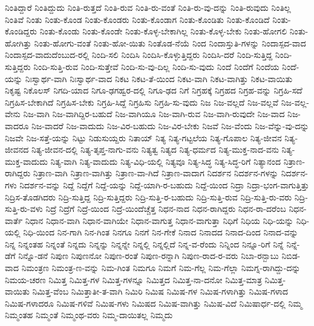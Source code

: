 {ನಿಂತಿದ್ದಾರೆ
ನಿಂತಿದ್ದುದು
ನಿಂತಿ-ರುತ್ತದೆ
ನಿಂತಿ-ರುವ
ನಿಂತಿ-ರು-ವಂತೆ
ನಿಂತಿ-ರು-ವು-ದನ್ನು
ನಿಂತಿ-ರುವುದು
ನಿಂತಿಲ್ಲ
ನಿಂತಿವೆ
ನಿಂತು
ನಿಂತು-ಕೊಂಡ
ನಿಂತು-ಕೊಂಡರು
ನಿಂತು-ಕೊಂಡಾಗ
ನಿಂತು-ಕೊಂಡಿತು
ನಿಂತು-ಕೊಂಡಿದೆ
ನಿಂತು-ಕೊಂಡಿದ್ದರು
ನಿಂತು-ಕೊಂಡು
ನಿಂತು-ಕೊಂಡೇ
ನಿಂತು-ಕೊಳ್ಳ-ಬೇಕಾಗಿಲ್ಲ
ನಿಂತು-ಕೊಳ್ಳ-ಬೇಕು
ನಿಂತು-ಹೋಗಲಿ
ನಿಂತು-ಹೋಗಿತ್ತು
ನಿಂತು-ಹೋಗು-ವಂತೆ
ನಿಂತು-ಹೋ-ಯಿತು
ನಿಂತೊಡ-ನೆಯೆ
ನಿಂದ
ನಿಂದಾಸ್ತುತಿ-ಗಳನ್ನು
ನಿಂದಾಸ್ಪದ-ವಾದ
ನಿಂದಾಸ್ಪದ-ವಾದುದೆಂಬುದ-ರಲ್ಲಿ
ನಿಂದಿ-ಸಲಿ
ನಿಂದಿಸಿ
ನಿಂದಿಸಿ-ಕೊಳ್ಳುತ್ತಿದ್ದರು
ನಿಂದಿಸಿ-ದರೆ
ನಿಂದಿ-ಸುತ್ತಿದ್ದ
ನಿಂದಿ-ಸುತ್ತಿದ್ದರು
ನಿಂದಿ-ಸುತ್ತಿ-ರುವ
ನಿಂದಿ-ಸುತ್ತೇವೆ
ನಿಂದಿ-ಸು-ವು-ದಿಲ್ಲ
ನಿಂದಿ-ಸು-ವುದು
ನಿಂದೆ
ನಿಂದೆಗೆ
ನಿಂದೆಯ
ನಿಂದೆ-ಯನ್ನು
ನಿಃಸ್ವಾರ್ಥ-ವಾಗಿ
ನಿಃಸ್ವಾರ್ಥ-ವಾದ
ನಿಕಟ
ನಿಕಟ-ತೆ-ಯಿಂದ
ನಿಕಟ-ವಾಗಿ
ನಿಕಟ-ವಾಗಿತ್ತು
ನಿಕಟ-ವಾಯಿತು
ನಿಕೃಷ್ಟ
ನಿಕೊಲಸ್
ನಿಗದಿ-ಯಾದ
ನಿಗೂ-ಢಗಹ್ವರ-ದಲ್ಲಿ
ನಿಗೂ-ಢದ
ನಿಗೆ
ನಿಗ್ರಹಕ್ಕೆ
ನಿಗ್ರಹದ
ನಿಗ್ರಹ-ವನ್ನು
ನಿಗ್ರಹಿ-ಸದೆ
ನಿಗ್ರಹಿಸ-ಬೇಕಾಗಿದೆ
ನಿಗ್ರಹಿಸ-ಬೇಕು
ನಿಗ್ರಹಿ-ಸಿದ್ದೆ
ನಿಗ್ರಹಿಸು
ನಿಗ್ರಹಿ-ಸು-ವುದು
ನಿಜ
ನಿಜ-ವಲ್ಲದೆ
ನಿಜ-ವಲ್ಲವೆ
ನಿಜ-ವಲ್ಲ-ವೇನು
ನಿಜ-ವಾಗಿ
ನಿಜ-ವಾಗಿದ್ದಿರ-ಬಹುದೆ
ನಿಜ-ವಾಗಿಯೂ
ನಿಜ-ವಾಗಿ-ರುವ
ನಿಜ-ವಾಗಿ-ರುವುದೇ
ನಿಜ-ವಾದ
ನಿಜ-ವಾದರೂ
ನಿಜ-ವಾದರೆ
ನಿಜ-ವಾದುದು
ನಿಜ-ವಿರ-ಬಹುದು
ನಿಜ-ವಿರ-ಬೇಕು
ನಿಜವೆ
ನಿಜ-ವೆಂದು
ನಿಜ-ವೆನ್ನು-ವು-ದನ್ನು
ನಿಜವೇ
ನಿಜ-ಸತ್ತೆ-ಯನ್ನು
ನಿಟ್ಟು
ನಿಡುಸುಯ್ದರು
ನಿತಾಯ್
ನಿತ್ಯ
ನಿತ್ಯ-ಗಟ್ಟಲೆಯ
ನಿತ್ಯ-ಗೊಪಾಲ
ನಿತ್ಯ-ಜೀವನ
ನಿತ್ಯ-ಜೀವನದ
ನಿತ್ಯ-ಜೀವನ-ದಲ್ಲಿ
ನಿತ್ಯ-ತೃಪ್ತ-ನಾಗು-ವನು
ನಿತ್ಯತ್ವ
ನಿತ್ಯದ
ನಿತ್ಯ-ಧರ್ಮದ
ನಿತ್ಯ-ಮುಕ್ತ-ನಾದ-ವನು
ನಿತ್ಯ-ಮುಕ್ತ-ವಾದುದು
ನಿತ್ಯ-ವಾಗಿ
ನಿತ್ಯ-ವಾದುದು
ನಿತ್ಯ-ವಿಧಿ-ಯಲ್ಲಿ
ನಿತ್ಯವೂ
ನಿತ್ಯ-ಸಿದ್ಧ
ನಿತ್ಯ-ಸಿದ್ಧ-ರಿಗೆ
ನಿತ್ಯಾನಂದ
ನಿತ್ರಾಣ-ರಾಗಿದ್ದರು
ನಿತ್ರಾಣ-ವಾಗಿ
ನಿತ್ರಾಣ-ವಾಗಿತ್ತು
ನಿತ್ರಾಣ-ವಾ-ಗಿದೆ
ನಿತ್ರಾಣ-ವಾದಾಗ
ನಿದರ್ಶನ
ನಿದರ್ಶನ-ಗಳನ್ನು
ನಿದರ್ಶನ-ಗಳು
ನಿದರ್ಶನ-ವನ್ನು
ನಿದ್ದೆ
ನಿದ್ದೆಗೆ
ನಿದ್ದೆ-ಯನ್ನು
ನಿದ್ದೆ-ಯಾಗಿ-ರ-ಬಹುದು
ನಿದ್ದೆ-ಯಿಂದ
ನಿದ್ರಾ
ನಿದ್ರಾ-ಭಂಗ-ವಾಗುತ್ತಿತ್ತು
ನಿದ್ರಿಸ-ತೊಡಗಿದರು
ನಿದ್ರಿ-ಸುತ್ತಿದ್ದ
ನಿದ್ರಿ-ಸುತ್ತಿದ್ದರು
ನಿದ್ರಿ-ಸುತ್ತಿ-ರ-ಬಹುದು
ನಿದ್ರಿ-ಸುತ್ತಿ-ರುವ
ನಿದ್ರಿ-ಸುತ್ತಿ-ರು-ವರು
ನಿದ್ರಿ-ಸುತ್ತಿ-ರು-ವಳು
ನಿದ್ರೆ
ನಿದ್ರೆಗೆ
ನಿದ್ರೆ-ಯಿಂದ
ನಿದ್ರೆ-ಯಿಂದೆಚ್ಚೆತ್ತ
ನಿಧನ-ನಾದ
ನಿಧನ-ರಾಗಿದ್ದರು
ನಿಧನ-ರಾ-ದರೆಂಬ
ನಿಧನ-ವಾರ್ತೆ
ನಿಧಾನ
ನಿಧಾನ-ವಾಗಿ
ನಿಧಾನ-ವಾಗಿಯೇ
ನಿಧಾನ-ವಾಗುತ್ತ
ನಿಧಾನ-ವಾಗುತ್ತಾ
ನಿಧಿಗೆ
ನಿಧಿಯ
ನಿಧಿ-ಯನ್ನು
ನಿಧಿ-ಯಲ್ಲಿ
ನಿಧಿ-ಯಿಂದ
ನಿನ-ಗಾಗಿ
ನಿನ-ಗಿಂತ
ನಿನಗೂ
ನಿನಗೆ
ನಿನ-ಗೇಕೆ
ನಿನಾದ
ನಿನಾದದ
ನಿನಾದ-ದಿಂದ
ನಿನಾದ-ವನ್ನು
ನಿನ್ನ
ನಿನ್ನಂತಹ
ನಿನ್ನಂತೆ
ನಿನ್ನದು
ನಿನ್ನನ್ನು
ನಿನ್ನನ್ನೇ
ನಿನ್ನಲ್ಲಿ
ನಿನ್ನಲ್ಲಿದೆ
ನಿನ್ನ-ವ-ರೆಂದು
ನಿನ್ನಿಂದ
ನಿನ್ನೂ-ರಿಗೆ
ನಿನ್ನೆ
ನಿನ್ನೆ-ಡೆಗೆ
ನಿನ್ನೊ-ಡನೆ
ನಿಪುಣ
ನಿಪುಣನೋ
ನಿಪುಣ-ರಂತೆ
ನಿಪುಣ-ರನ್ನಾಗಿ
ನಿಪುಣ-ರಾದ-ರ-ವರು
ನಿಬಾ-ರನ್ಬಾಬು
ನಿಬಿಡ-ವಾದ
ನಿಮಂತ್ರಣ
ನಿಮಂತ್ರ-ಣ-ವನ್ನು
ನಿಮ-ಗಿಂತ
ನಿಮಗೂ
ನಿಮಗೆ
ನಿಮ-ಗೆಲ್ಲ
ನಿಮ-ಗೆಲ್ಲಾ
ನಿಮಗ್ನ-ರಾಗಿದ್ದು-ದನ್ನು
ನಿಮಯ-ಚರಣ
ನಿಮಿತ್ತ
ನಿಮಿತ್ತ-ಗಳ
ನಿಮಿತ್ತ-ಗಳನ್ನೂ
ನಿಮಿತ್ತದ
ನಿಮಿತ್ತ-ನಾ-ದನೋ
ನಿಮಿತ್ತ-ಮಾತ್ರ
ನಿಮಿತ್ತ-ವಾಯಿತು
ನಿಮಿತ್ತ-ವೆಂಬ
ನಿಮಿತ್ತಾತೀ-ತ-ವಾಗಿ
ನಿಮಿರಿ
ನಿಮಿಷ
ನಿಮಿಷ-ಗಳ
ನಿಮಿಷ-ಗಳಾಗಿತ್ತು
ನಿಮಿಷ-ಗಳಾದ
ನಿಮಿಷ-ಗಳಾದರೂ
ನಿಮಿಷ-ಗಳಿವೆ
ನಿಮಿಷ-ಗಳು
ನಿಮಿಷದ
ನಿಮಿಷ-ವಾಗಿತ್ತು
ನಿಮಿಷ-ವಿದೆ
ನಿಮಿಷಾರ್ಧ-ದಲ್ಲಿ
ನಿಮ್ಮ
ನಿಮ್ಮಂತಹ
ನಿಮ್ಮಂತೆ
ನಿಮ್ಮಂಥ-ವರು
ನಿಮ್ಮ-ದಾಯಿತಲ್ಲ
ನಿಮ್ಮದು
}
